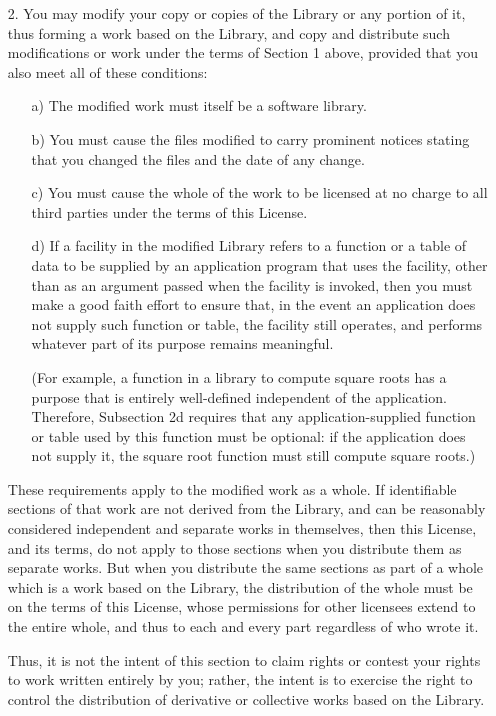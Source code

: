 \begin{itemize}
\item[2.] 
   You may modify your copy or copies of the Library or any portion
of it, thus forming a work based on the Library, and copy and
distribute such modifications or work under the terms of Section 1
above, provided that you also meet all of these conditions:

    \begin{itemize}
    \item[a)] 
     The modified work must itself be a software library.
    \item[b)] 
    You must cause the files modified to carry prominent notices
    stating that you changed the files and the date of any change.
    \item[c)] 
    You must cause the whole of the work to be licensed at no
    charge to all third parties under the terms of this License.
    \item[d)] 
     If a facility in the modified Library refers to a function or a
    table of data to be supplied by an application program that uses
    the facility, other than as an argument passed when the facility
    is invoked, then you must make a good faith effort to ensure that,
    in the event an application does not supply such function or
    table, the facility still operates, and performs whatever part of
    its purpose remains meaningful.

    (For example, a function in a library to compute square roots has
    a purpose that is entirely well-defined independent of the
    application.  Therefore, Subsection 2d requires that any
    application-supplied function or table used by this function must
    be optional: if the application does not supply it, the square
    root function must still compute square roots.)
    \end{itemize}

These requirements apply to the modified work as a whole.  If
identifiable sections of that work are not derived from the Library,
and can be reasonably considered independent and separate works in
themselves, then this License, and its terms, do not apply to those
sections when you distribute them as separate works.  But when you
distribute the same sections as part of a whole which is a work based
on the Library, the distribution of the whole must be on the terms of
this License, whose permissions for other licensees extend to the
entire whole, and thus to each and every part regardless of who wrote
it.

Thus, it is not the intent of this section to claim rights or contest
your rights to work written entirely by you; rather, the intent is to
exercise the right to control the distribution of derivative or
collective works based on the Library.


\end{itemize}
